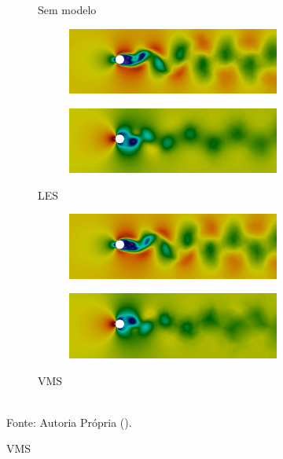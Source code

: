\begin{figure}[h!]
\begin{subfigure}{\textwidth}
\begin{subfigure}{.49\textwidth}
        \end{subfigure}
        \caption{Sem modelo}
    \end{subfigure}
    \begin{subfigure}{\textwidth}\centering
        \begin{subfigure}{.49\textwidth}
            \includegraphics[width=\linewidth]{Figuras/cylinder/analise2/LES-TH-u.png}
        \end{subfigure}
        \begin{subfigure}{.49\textwidth}
            \includegraphics[width=\linewidth]{Figuras/cylinder/analise2/LES-TH-p.png}
        \end{subfigure}
        \caption{LES}
    \end{subfigure}
    \begin{subfigure}{\textwidth}\centering
        \begin{subfigure}{.49\textwidth}
            \includegraphics[width=\linewidth]{Figuras/cylinder/analise2/VMS-TH-u.png}
        \end{subfigure}
        \begin{subfigure}{.49\textwidth}
            \includegraphics[width=\linewidth]{Figuras/cylinder/analise2/VMS-TH-p.png}
        \end{subfigure}
        \caption{VMS}
    \end{subfigure}
    \\Fonte: Autoria Própria (\the\year).
    \label{fig:vel-pre-TH}
\end{figure}